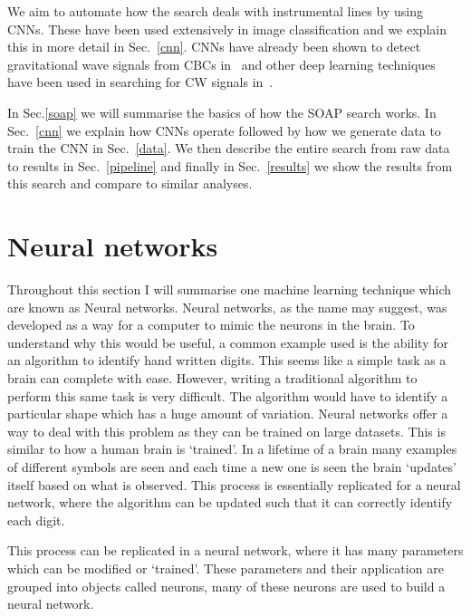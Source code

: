 %

We aim to automate how the search deals with instrumental lines by using \acp{CNN}.
These have been used extensively in image classification and we explain this in
more detail in Sec.~\ref{cnn}. \acp{CNN}
have already been shown to detect gravitational wave signals from \acp{CBC}
in~\cite{gabbard2018MatchingMatched,george2018DeepLearning,gebhard2019ConvolutionalNeural}
and other deep learning techniques have been used in searching for \ac{CW}
signals in~\cite{dreissigacker2019DeeplearningContinuous}. 

%
In Sec.\ref{soap} we will summarise the basics of how the SOAP search works. In
Sec.~\ref{cnn} we explain how \acp{CNN} operate followed by how we generate
data to train the \ac{CNN} in Sec.~\ref{data}. We then describe the entire search from raw data to results in Sec.~\ref{pipeline} and finally in Sec.~\ref{results} we
show the results from this search and compare to similar analyses. 

\section{\label{machine:nn}Neural networks}


Throughout this section I will summarise one machine learning technique which are known as Neural networks. 
Neural networks, as the name may suggest, was developed as a way for a computer to mimic the neurons in the brain.
To understand why this would be useful, a common example used is the ability for an algorithm to identify hand written digits.
This seems like a simple task as a brain can complete with ease. 
However, writing a traditional algorithm to perform this same task is very difficult. 
The algorithm would have to identify a particular shape which has a huge amount of variation.
Neural networks offer a way to deal with this problem as they can be trained on large datasets.
This is similar to how a human brain is `trained'. 
In a lifetime of a brain many examples of different symbols are seen and each time a new one is seen the brain `updates' itself based on what is observed. 
This process is essentially replicated for a neural network, where the algorithm can be updated such that it can correctly identify each digit.

This process can be replicated in a neural network, where it has many parameters which can be modified or `trained'. 
These parameters and their application are grouped into objects called neurons, many of these neurons are used to build a neural network.

